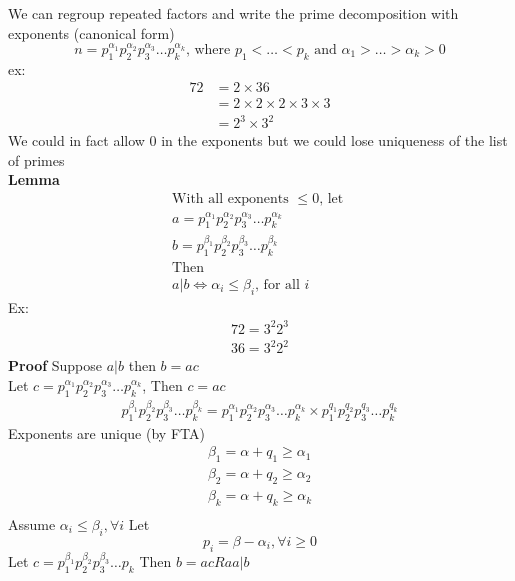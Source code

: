 \documentclass{article}
\begin{document}
We can regroup repeated factors and write the prime decomposition with exponents (canonical form)
\[
    n = p_1 ^{\alpha_1} p_2  ^{\alpha_2} p_3 ^{\alpha_3} \dots  p_k^{\alpha_k} \text{, where } p_1 < \dots < p_k \text{ and } \alpha_1 > \dots > \alpha_k > 0
\]
ex:
\begin{align*}
    72
     & = 2 \times 36                           \\
     & = 2 \times 2 \times 2 \times 3 \times 3 \\
     & = 2 ^{3} \times 3 ^{2}
\end{align*}
We could in fact allow 0 in the exponents but we could lose uniqueness of the list of primes\\
\textbf{Lemma}
\begin{gather*}
    \text{With all exponents $\le 0$, let }\\
    a = p_1 ^{\alpha_1} p_2  ^{\alpha_2} p_3 ^{\alpha_3} \dots  p_k^{\alpha_k} \\
    b = p_1 ^{\beta_1} p_2  ^{\beta_2} p_3 ^{\beta_3} \dots  p_k^{\beta_k}
    \\ \text{Then}\\
    a | b \iff \alpha_i \le \beta_i \text{, for all } i
\end{gather*}
Ex:
\begin{gather*}
    72 = 3 ^{2} 2^3 \\
    36 = 3 ^{2} 2 ^{2}
\end{gather*}
\textbf{Proof} Suppose $a|b$ then $b=ac$ \\
Let $c = p_1 ^{\alpha_1} p_2  ^{\alpha_2} p_3 ^{\alpha_3} \dots  p_k^{\alpha_k}$, Then $c = ac$
\begin{gather*}
    p_1 ^{\beta_1} p_2  ^{\beta_2} p_3 ^{\beta_3} \dots  p_k^{\beta_k} =p_1 ^{\alpha_1} p_2  ^{\alpha_2} p_3 ^{\alpha_3} \dots  p_k^{\alpha_k} \times  p_1 ^{q_1} p_2  ^{q_2} p_3 ^{q_3} \dots  p_k^{q_k}
\end{gather*}
Exponents are unique (by FTA)
\begin{gather*}
    \beta_1 = \alpha + q_1 \ge \alpha_1\\
    \beta_2 = \alpha + q_2 \ge \alpha_2\\
    \beta_k = \alpha + q_k \ge \alpha_k\\
\end{gather*}
Assume $\alpha _i \le \beta _i, \forall i$
Let \[
    p_i = \beta-\alpha_i, \forall i \ge 0
\]
Let $c = p_1 ^{\beta_1} p_2  ^{\beta_2} p_3 ^{\beta_3} \dots  p_k$
Then $b = ac Ra a | b$
\end{document}
